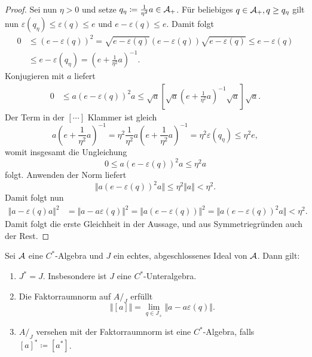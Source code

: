 \begin{proof}
    Sei nun $\eta > 0$ und setze $q_\eta \coloneqq \frac{1}{\eta^2} a \in \mathcal{A}_+$. Für beliebiges $q \in \mathcal{A}_+, q \geq q_\eta$ gilt nun $\varepsilon(q_\eta) \leq \varepsilon(q) \leq e$ und $e - \varepsilon(q) \leq e$. Damit folgt
    \begin{align*}
        0
        &\leq
        (e - \varepsilon(q))^2
        =
        \sqrt{e - \varepsilon(q)} (e - \varepsilon(q)) \sqrt{e - \varepsilon(q)}
        \leq
        e - \varepsilon(q) \\
        &\leq
        e - \varepsilon(q_\eta)
        = \left( e + \frac{1}{\eta^2} a \right)^{-1}.
    \end{align*}
    Konjugieren mit $a$ liefert
    \begin{align*}
        0
        &\leq
        a(e - \varepsilon(q))^2 a
        \leq
        \sqrt{a} \left[ \sqrt{a} \left( e + \frac{1}{\eta^2} a \right)^{-1} \sqrt{a} \right] \sqrt{a}.
    \end{align*}
    Der Term in der $[\cdots]$ Klammer ist gleich
    \[
        a \left( e + \frac{1}{\eta^2} a \right)^{-1} = \eta^2 \frac{1}{\eta^2} a \left( e + \frac{1}{\eta^2} a \right)^{-1} = \eta^2 \varepsilon(q_\eta) \leq \eta^2 e,
    \]
    womit insgesamt die Ungleichung
    \[
        0
        \leq
        a (e - \varepsilon(q))^2 a \leq \eta^2 a
    \]
    folgt. Anwenden der Norm liefert
    \[
        \Vert a (e - \varepsilon(q))^2 a \Vert \leq \eta^2 \Vert a \Vert < \eta^2.
    \]
    Damit folgt nun
    \begin{align*}
        \Vert a - \varepsilon(q) a \Vert^2
        &=
        \Vert a - a \varepsilon(q) \Vert^2
        =
        \Vert a (e - \varepsilon(q) ) \Vert^2
        =
        \Vert a (e - \varepsilon(q))^2 a \Vert
        <
        \eta^2.
    \end{align*}
    Damit folgt die erste Gleichheit in der Aussage, und aus Symmetriegründen auch der Rest.
\end{proof}

\begin{proposition}
    Sei $\mathcal{A}$ eine $C^*$-Algebra und $J$ ein echtes, abgeschlossenes Ideal von $\mathcal{A}$. Dann gilt:
    \begin{enumerate}
        \item $J^* = J$. Insbesondere ist $J$ eine $C^*$-Unteralgebra.
        \item Die Faktorraumnorm auf $A/_J$ erfüllt
        $$ \Vert [a] \Vert = \lim_{q \in J_+} \Vert a - a \varepsilon(q) \Vert. $$
        \item $A/_J$ versehen mit der Faktorraumnorm ist eine $C^*$-Algebra, falls $[a]^* \coloneqq [a^*]$.
    \end{enumerate}
\end{proposition}

